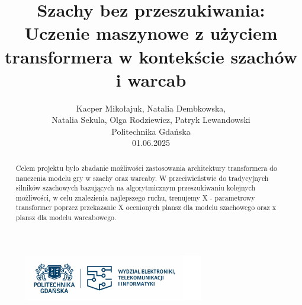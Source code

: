 \documentclass[12pt]{article}
\title{Szachy bez przeszukiwania: \\Uczenie maszynowe z użyciem transformera w kontekście szachów i warcab}
\author{Kacper Mikołajuk, Natalia Dembkowska, \\Natalia Sekula, Olga Rodziewicz, Patryk Lewandowski \\ Politechnika Gdańska \\01.06.2025}
\date{}
\begin{document}
\maketitle

\begin{abstract}
Celem projektu było zbadanie możliwości zastosowania architektury transformera do nauczenia modelu gry w szachy oraz warcaby. W przeciwieństwie do tradycyjnych silników szachowych bazujących na algorytmicznym przeszukiwaniu kolejnych możliwości, w celu znalezienia najlepszego ruchu, trenujemy X - parametrowy transformer poprzez przekazanie X ocenionych plansz dla modelu szachowego oraz x plansz dla modelu warcabowego.
\end{abstract}

\begin{figure}[b]
  \centering
  \includegraphics[width=0.7\textwidth]{logotyp-PG-i-WETI.jpg}

\end{figure}

\clearpage
\tableofcontents
\clearpage
\end{document}
